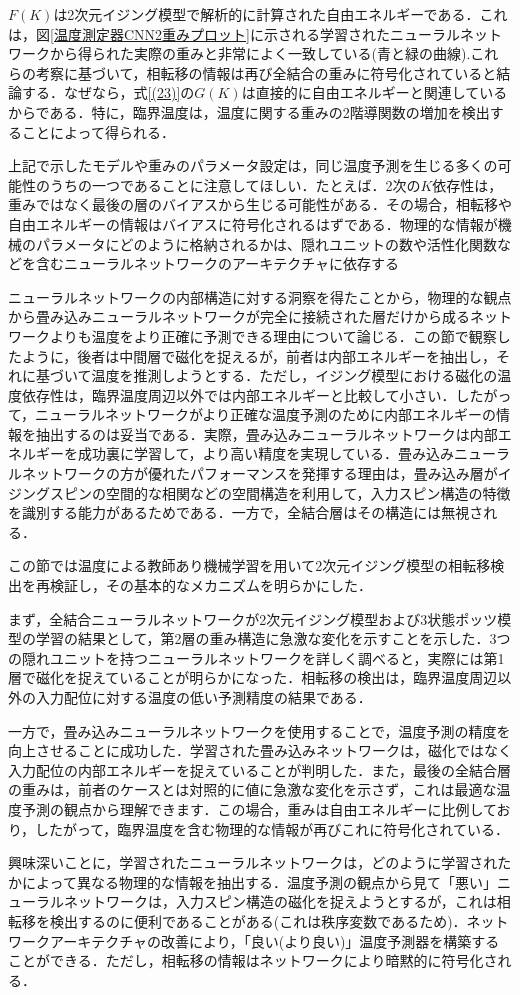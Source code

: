 \documentclass[a4paper,11pt]{jsreport}
\begin{document}
$F(K)$は2次元イジング模型で解析的に計算された自由エネルギーである．これは，図\ref{温度測定器CNN2重みプロット}に示される学習されたニューラルネットワークから得られた実際の重みと非常によく一致している(青と緑の曲線).これらの考察に基づいて，相転移の情報は再び全結合の重みに符号化されていると結論する．なぜなら，式\ref{(23)}の$G(K)$は直接的に自由エネルギーと関連しているからである．特に，臨界温度は，温度に関する重みの2階導関数の増加を検出することによって得られる．\par
上記で示したモデルや重みのパラメータ設定は，同じ温度予測を生じる多くの可能性のうちの一つであることに注意してほしい．たとえば．2次の$K$依存性は，重みではなく最後の層のバイアスから生じる可能性がある．その場合，相転移や自由エネルギーの情報はバイアスに符号化されるはずである．物理的な情報が機械のパラメータにどのように格納されるかは、隠れユニットの数や活性化関数などを含むニューラルネットワークのアーキテクチャに依存する\par
ニューラルネットワークの内部構造に対する洞察を得たことから，物理的な観点から畳み込みニューラルネットワークが完全に接続された層だけから成るネットワークよりも温度をより正確に予測できる理由について論じる．この節で観察したように，後者は中間層で磁化を捉えるが，前者は内部エネルギーを抽出し，それに基づいて温度を推測しようとする．ただし，イジング模型における磁化の温度依存性は，臨界温度周辺以外では内部エネルギーと比較して小さい．したがって，ニューラルネットワークがより正確な温度予測のために内部エネルギーの情報を抽出するのは妥当である．実際，畳み込みニューラルネットワークは内部エネルギーを成功裏に学習して，より高い精度を実現している．畳み込みニューラルネットワークの方が優れたパフォーマンスを発揮する理由は，畳み込み層がイジングスピンの空間的な相関などの空間構造を利用して，入力スピン構造の特徴を識別する能力があるためである．一方で，全結合層はその構造には無視される．\par
この節では温度による教師あり機械学習を用いて2次元イジング模型の相転移検出を再検証し，その基本的なメカニズムを明らかにした．\par
まず，全結合ニューラルネットワークが2次元イジング模型および3状態ポッツ模型の学習の結果として，第2層の重み構造に急激な変化を示すことを示した．3つの隠れユニットを持つニューラルネットワークを詳しく調べると，実際には第1層で磁化を捉えていることが明らかになった．相転移の検出は，臨界温度周辺以外の入力配位に対する温度の低い予測精度の結果である．\par
一方で，畳み込みニューラルネットワークを使用することで，温度予測の精度を向上させることに成功した．学習された畳み込みネットワークは，磁化ではなく入力配位の内部エネルギーを捉えていることが判明した．また，最後の全結合層の重みは，前者のケースとは対照的に値に急激な変化を示さず，これは最適な温度予測の観点から理解できます．この場合，重みは自由エネルギーに比例しており，したがって，臨界温度を含む物理的な情報が再びこれに符号化されている．\par
興味深いことに，学習されたニューラルネットワークは，どのように学習されたかによって異なる物理的な情報を抽出する．温度予測の観点から見て「悪い」ニューラルネットワークは，入力スピン構造の磁化を捉えようとするが，これは相転移を検出するのに便利であることがある(これは秩序変数であるため)．ネットワークアーキテクチャの改善により，「良い(より良い)」温度予測器を構築することができる．ただし，相転移の情報はネットワークにより暗黙的に符号化される．
\end{document}
